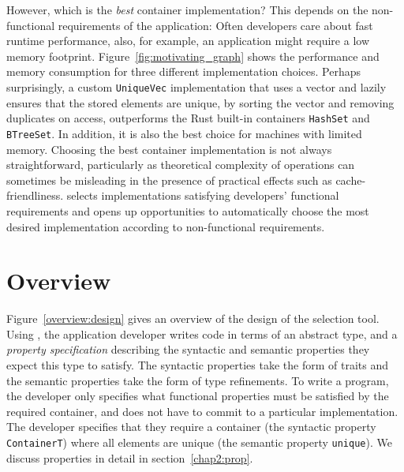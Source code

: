 However, which is the \emph{best} container implementation?
This depends on the non-functional requirements of the application:
Often developers care about fast runtime performance, also, for example, an application might require a low memory footprint.
Figure~\ref{fig:motivating_graph} shows the performance and memory consumption for three different implementation choices.
Perhaps surprisingly, a custom \lstinline{UniqueVec} implementation that uses a vector and lazily ensures that the stored elements are unique, by sorting the vector and removing duplicates on access, outperforms the Rust built-in containers \lstinline{HashSet} and \lstinline{BTreeSet}. In addition, it is also the best choice for machines with limited memory.
Choosing the best container implementation is not always straightforward, particularly as theoretical complexity of operations can sometimes be misleading in the presence of practical effects such as cache-friendliness. \Primrose{} selects implementations satisfying developers' functional requirements and opens up opportunities to automatically choose the most desired implementation according to non-functional requirements. 

\section{Overview}
\label{chap2:overview}
Figure~\ref{overview:design} gives an overview of the design of the \Primrose{} selection tool. Using \Primrose{}, the application developer writes code in terms of an abstract type, and a 
\emph{property specification} describing the syntactic and semantic properties they expect this type to satisfy. The syntactic properties take the form of traits and the semantic 
properties take the form of type refinements.
To write a program, the developer only specifies what functional properties must be satisfied by the required container, and does not have to commit to a particular 
implementation. The developer specifies that they require a container (the syntactic property \lstinline{ContainerT}) where all elements are unique (the semantic property \lstinline{unique}). We discuss properties in detail in section~\ref{chap2:prop}.

